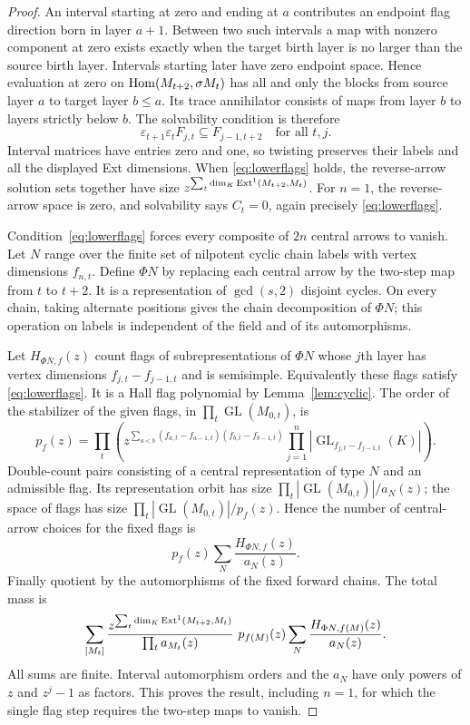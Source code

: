 \begin{proof}
An interval starting at zero and ending at $a$ contributes an endpoint flag direction born in layer $a+1$. Between two such intervals a map with nonzero component at zero exists exactly when the target birth layer is no larger than the source birth layer. Intervals starting later have zero endpoint space. Hence evaluation at zero on $\operatorname{Hom}(M_{t+2},\sigma M_t)$ has all and only the blocks from source layer $a$ to target layer $b\le a$. Its trace annihilator consists of maps from layer $b$ to layers strictly below $b$. The solvability condition is therefore
\begin{equation}\label{eq:lowerflags}
 \varepsilon_{t+1}\varepsilon_t F_{j,t}\subseteq F_{j-1,t+2}
 \quad\text{for all }t,j.
\end{equation}
Interval matrices have entries zero and one, so twisting preserves their labels and all the displayed Ext dimensions. When \eqref{eq:lowerflags} holds, the reverse-arrow solution sets together have size
$z^{\sum_t\dim_K\operatorname{Ext}^1(M_{t+2},M_t)}$.
For $n=1$, the reverse-arrow space is zero, and solvability says $C_t=0$, again precisely \eqref{eq:lowerflags}.

Condition~\eqref{eq:lowerflags} forces every composite of $2n$ central arrows to vanish. Let $N$ range over the finite set of nilpotent cyclic chain labels with vertex dimensions $f_{n,t}$. Define $\Phi N$ by replacing each central arrow by the two-step map from $t$ to $t+2$. It is a representation of $\gcd(s,2)$ disjoint cycles. On every chain, taking alternate positions gives the chain decomposition of $\Phi N$; this operation on labels is independent of the field and of its automorphisms.

Let $H_{\Phi N,f}(z)$ count flags of subrepresentations of $\Phi N$ whose $j$th layer has vertex dimensions $f_{j,t}-f_{j-1,t}$ and is semisimple. Equivalently these flags satisfy \eqref{eq:lowerflags}. It is a Hall flag polynomial by Lemma~\ref{lem:cyclic}. The order of the stabilizer of the given flags, in $\prod_t\operatorname{GL}(M_{0,t})$, is
\[
 p_f(z)=\prod_t\left(
 z^{\sum_{a<b}(f_{a,t}-f_{a-1,t})(f_{b,t}-f_{b-1,t})}
 \prod_{j=1}^n|\operatorname{GL}_{f_{j,t}-f_{j-1,t}}(K)|\right).
\]
Double-count pairs consisting of a central representation of type $N$ and an admissible flag. Its representation orbit has size $\prod_t|\operatorname{GL}(M_{0,t})|/a_N(z)$; the space of flags has size $\prod_t|\operatorname{GL}(M_{0,t})|/p_f(z)$. Hence the number of central-arrow choices for the fixed flags is
\[
 p_f(z)\sum_N\frac{H_{\Phi N,f}(z)}{a_N(z)}.
\]
Finally quotient by the automorphisms of the fixed forward chains. The total mass is
\begin{equation}\label{eq:coretotal}
 \sum_{[M_t]}
 \frac{z^{\sum_t\dim_K\operatorname{Ext}^1(M_{t+2},M_t)}}{\prod_t a_{M_t}(z)}
 \ p_{f(M)}(z)\sum_N\frac{H_{\Phi N,f(M)}(z)}{a_N(z)}.
\end{equation}
All sums are finite. Interval automorphism orders and the $a_N$ have only powers of $z$ and $z^j-1$ as factors. This proves the result, including $n=1$, for which the single flag step requires the two-step maps to vanish.
\end{proof}
